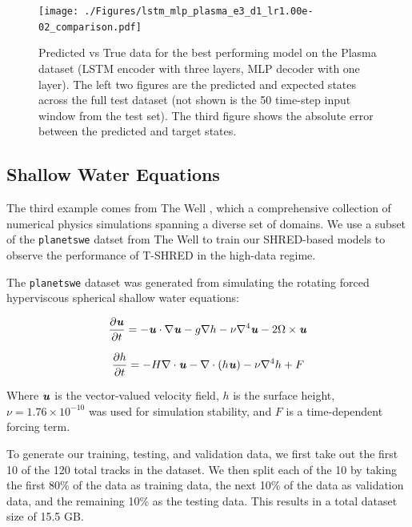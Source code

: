 \documentclass[11pt, a4paper]{article}
\begin{document}
\begin{figure}[H]
\centering
\texttt{[image: ./Figures/lstm\_mlp\_plasma\_e3\_d1\_lr1.00e-02\_comparison.pdf]}
\caption{Predicted vs True data for the best performing model on the Plasma dataset (LSTM encoder with three layers, MLP decoder with one layer). The left two figures are the predicted and expected states across the full test dataset (not shown is the 50 time-step input window from the test set). The third figure shows the absolute error between the predicted and target states.}\label{fig:plasma_comparison}
\end{figure}

\subsection{Shallow Water Equations}

The third example comes from The Well \cite{ohana2025welllargescalecollectiondiverse}, which a comprehensive collection of numerical physics simulations spanning a diverse set of domains. We use a subset of the \texttt{planetswe} datset from The Well to train our SHRED-based models to observe the performance of T-SHRED in the high-data regime.

The \texttt{planetswe} dataset was generated from simulating the rotating forced hyperviscous spherical shallow water equations:

\begin{equation}
    \frac{\partial \textbf{\textit{u}}}{\partial t} = -\textbf{\textit{u}} \cdot \nabla \textbf{\textit{u}} - g \nabla h - \nu \nabla ^4 \textbf{\textit{u}} - 2 \Omega \times \textbf{\textit{u}}
\end{equation}

\begin{equation}
    \frac{\partial h}{\partial t} = -H \nabla \cdot \textbf{\textit{u}} - \nabla \cdot (h \textbf{\textit{u}}) - \nu \nabla ^4 h + F
\end{equation}

Where $\textbf{\textit{u}}$ is the vector-valued velocity field, $h$ is the surface height, $\nu=1.76 \times 10^{-10}$ was used for simulation stability, and $F$ is a time-dependent forcing term.

To generate our training, testing, and validation data, we first take out the first 10 of the 120 total tracks in the dataset. We then split each of the 10 by taking the first 80\% of the data as training data, the next 10\% of the data as validation data, and the remaining 10\% as the testing data. This results in a total dataset size of 15.5 GB.
\end{document}
